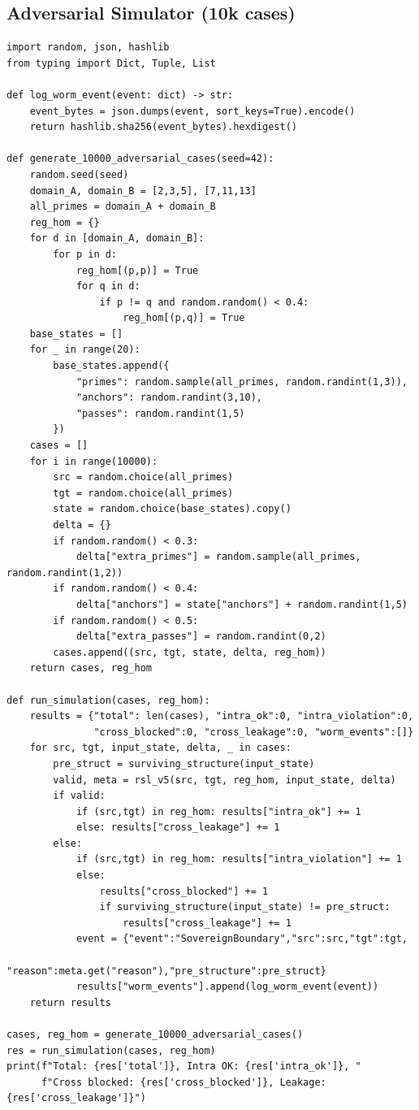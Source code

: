\documentclass[11pt,a4paper]{article}
\theoremstyle{definition}
\theoremstyle{remark}
\begin{document}
\subsection{Adversarial Simulator (10k cases)}
\label{subsec:simulator}
\begin{lstlisting}[style=pythonstyle, caption={10,000-case adversarial simulator with zero-leakage verification}, label=lst:sim]
import random, json, hashlib
from typing import Dict, Tuple, List

def log_worm_event(event: dict) -> str:
    event_bytes = json.dumps(event, sort_keys=True).encode()
    return hashlib.sha256(event_bytes).hexdigest()

def generate_10000_adversarial_cases(seed=42):
    random.seed(seed)
    domain_A, domain_B = [2,3,5], [7,11,13]
    all_primes = domain_A + domain_B
    reg_hom = {}
    for d in [domain_A, domain_B]:
        for p in d:
            reg_hom[(p,p)] = True
            for q in d:
                if p != q and random.random() < 0.4:
                    reg_hom[(p,q)] = True
    base_states = []
    for _ in range(20):
        base_states.append({
            "primes": random.sample(all_primes, random.randint(1,3)),
            "anchors": random.randint(3,10),
            "passes": random.randint(1,5)
        })
    cases = []
    for i in range(10000):
        src = random.choice(all_primes)
        tgt = random.choice(all_primes)
        state = random.choice(base_states).copy()
        delta = {}
        if random.random() < 0.3:
            delta["extra_primes"] = random.sample(all_primes, random.randint(1,2))
        if random.random() < 0.4:
            delta["anchors"] = state["anchors"] + random.randint(1,5)
        if random.random() < 0.5:
            delta["extra_passes"] = random.randint(0,2)
        cases.append((src, tgt, state, delta, reg_hom))
    return cases, reg_hom

def run_simulation(cases, reg_hom):
    results = {"total": len(cases), "intra_ok":0, "intra_violation":0,
               "cross_blocked":0, "cross_leakage":0, "worm_events":[]}
    for src, tgt, input_state, delta, _ in cases:
        pre_struct = surviving_structure(input_state)
        valid, meta = rsl_v5(src, tgt, reg_hom, input_state, delta)
        if valid:
            if (src,tgt) in reg_hom: results["intra_ok"] += 1
            else: results["cross_leakage"] += 1
        else:
            if (src,tgt) in reg_hom: results["intra_violation"] += 1
            else:
                results["cross_blocked"] += 1
                if surviving_structure(input_state) != pre_struct:
                    results["cross_leakage"] += 1
            event = {"event":"SovereignBoundary","src":src,"tgt":tgt,
                     "reason":meta.get("reason"),"pre_structure":pre_struct}
            results["worm_events"].append(log_worm_event(event))
    return results

cases, reg_hom = generate_10000_adversarial_cases()
res = run_simulation(cases, reg_hom)
print(f"Total: {res['total']}, Intra OK: {res['intra_ok']}, "
      f"Cross blocked: {res['cross_blocked']}, Leakage: {res['cross_leakage']}")
\end{lstlisting}
\end{document}

